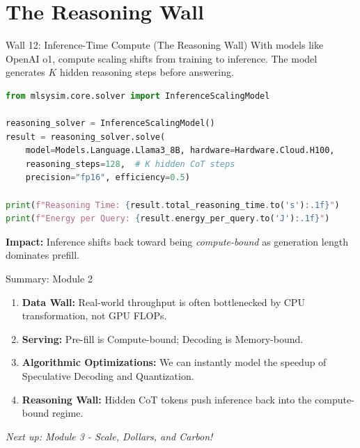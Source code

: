 \documentclass[aspectratio=169, 12pt]{beamer}
\begin{document}
\section{The Reasoning Wall}

\begin{frame}[fragile]{Wall 12: Inference-Time Compute (The Reasoning Wall)}
With models like OpenAI o1, compute scaling shifts from training to inference. The model generates $K$ hidden reasoning steps before answering.
\begin{lstlisting}[language=Python]
from mlsysim.core.solver import InferenceScalingModel

reasoning_solver = InferenceScalingModel()
result = reasoning_solver.solve(
    model=Models.Language.Llama3_8B, hardware=Hardware.Cloud.H100,
    reasoning_steps=128,  # K hidden CoT steps
    precision="fp16", efficiency=0.5)

print(f"Reasoning Time: {result.total_reasoning_time.to('s'):.1f}")
print(f"Energy per Query: {result.energy_per_query.to('J'):.1f}")
\end{lstlisting}
\vfill
\textbf{Impact:} Inference shifts back toward being \emph{compute-bound} as generation length dominates prefill.
\end{frame}

\begin{frame}{Summary: Module 2}
\begin{enumerate}
  \item \textbf{Data Wall:} Real-world throughput is often bottlenecked by CPU transformation, not GPU FLOPs.
  \item \textbf{Serving:} Pre-fill is Compute-bound; Decoding is Memory-bound.
  \item \textbf{Algorithmic Optimizations:} We can instantly model the speedup of Speculative Decoding and Quantization.
  \item \textbf{Reasoning Wall:} Hidden CoT tokens push inference back into the compute-bound regime.
\end{enumerate}
\vspace{1em}
\begin{center}
\textit{Next up: Module 3 - Scale, Dollars, and Carbon!}
\end{center}
\end{frame}
\end{document}
